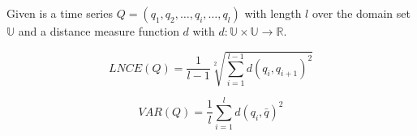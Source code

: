 Given is a time series $Q = (q_1, q_2, \dots, q_i, \dots, q_l)$
with length $l$ over the domain set $\mathbb{U}$ and a distance measure function $d$ with
$d: \mathbb{U} \times \mathbb{U} \to \mathbb{R}$.

\begin{equation}
    LNCE(Q) = \frac{1}{l-1}\sqrt[2]{\sum \limits_{i=1}^{l-1} d(q_i, q_{i + 1})^2}
\end{equation}

\begin{equation}
    VAR(Q) = \frac{1}{l}\sum \limits_{i=1}^{l} d(q_i, \bar{q})^2
\end{equation}
